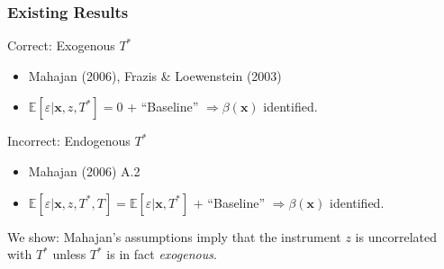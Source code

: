 \documentclass[handout]{beamer}
\begin{document}
\begin{frame}
  \frametitle{Existing Results} 

  \begin{block}{Correct: Exogenous $T^*$}
    \begin{itemize}
      \item Mahajan (2006), Frazis \& Loewenstein (2003)
      \item $\mathbb{E}[\varepsilon|\mathbf{x},z,T^*] = 0$ + ``Baseline'' $\Rightarrow \beta(\mathbf{x})$ identified.
   \end{itemize}
  \end{block}
  
  \begin{alertblock}{Incorrect: Endogenous $T^*$}
    \begin{itemize}
    \item Mahajan (2006) A.2
    \item $\mathbb{E}[\varepsilon|\mathbf{x}, z, T^*, T] = \mathbb{E}[\varepsilon|\mathbf{x},T^*]$ + ``Baseline'' $\Rightarrow \beta(\mathbf{x})$ identified. 
  \end{itemize}
  \end{alertblock}

  \begin{framed}
    We show: Mahajan's assumptions imply that the instrument $z$ is uncorrelated with $T^*$ unless $T^*$ is in fact \emph{exogenous}.
  \end{framed}



\end{frame}
\end{document}
